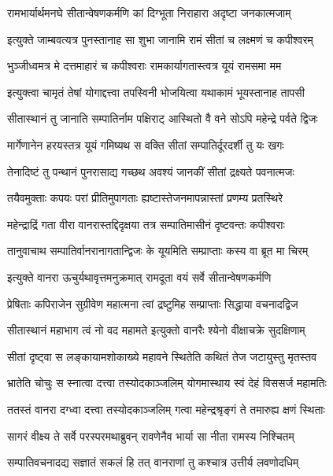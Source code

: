 \twolineshloka
{रामभार्यार्थमनघे सीतान्वेषणकर्मणि}
{कां दिग्भूता निराहारा अदृष्टा जनकात्मजाम्} %

\twolineshloka
{इत्युक्ते जाम्बवत्यत्र पुनस्तानाह सा शुभा}
{जानामि रामं सीतां च लक्ष्मणं च कपीश्वरम्} %

\twolineshloka
{भुञ्जीध्वमत्र मे दत्तमाहारं च कपीश्वराः}
{रामकार्यागतास्त्वत्र यूयं रामसमा मम} %

\twolineshloka
{इत्युक्त्वा चामृतं तेषां योगाद्दत्त्वा तपस्विनी}
{भोजयित्वा यथाकामं भूयस्तानाह तापसी} %

\twolineshloka
{सीतास्थानं तु जानाति सम्पातिर्नाम पक्षिराट्}
{आस्थितो वै वने सोऽपि महेन्द्रे पर्वते द्विजः} %

\twolineshloka
{मार्गेणानेन हरयस्तत्र यूयं गमिष्यथ}
{स वक्ति सीतां सम्पातिर्दूरदर्शी तु यः खगः} %

\twolineshloka
{तेनादिष्टं तु पन्थानं पुनरासाद्य गच्छथ}
{अवश्यं जानकीं सीतां द्रक्ष्यते पवनात्मजः} %

\twolineshloka
{तयैवमुक्ताः कपयः परां प्रीतिमुपागताः}
{ह्यष्टास्तेजनमापन्नास्तां प्रणम्य प्रतस्थिरे} %

\twolineshloka
{महेन्द्राद्रिं गता वीरा वानरास्तद्दिदृक्षया}
{तत्र सम्पातिमासीनं दृष्टवन्तः कपीश्वराः} %

\twolineshloka
{तानुवाचाथ सम्पातिर्वानरानागतान्द्विजः}
{के यूयमिति सम्प्राप्ताः कस्य वा ब्रूत मा चिरम्} %

\twolineshloka
{इत्युक्ते वानरा ऊचुर्यथावृत्तमनुक्रमात्}
{रामदूता वयं सर्वे सीतान्वेषणकर्मणि} %

\twolineshloka
{प्रेषिताः कपिराजेन सुग्रीवेण महात्मना}
{त्वां द्रष्टुमिह सम्प्राप्ताः सिद्धाया वचनादद्विज} %

\twolineshloka
{सीतास्थानं महाभाग त्वं नो वद महामते}
{इत्युक्तो वानरैः श्येनो वीक्षाचक्रे सुदक्षिणाम्} %

\twolineshloka
{सीतां दृष्ट्वा स लङ्कायामशोकाख्ये महावने}
{स्थितेति कथितं तेज जटायुस्तु मृतस्तव} %

\twolineshloka
{भ्रातेति चोचुः स स्नात्वा दत्त्वा तस्योदकाञ्जलिम्}
{योगमास्थाय स्वं देहं विससर्ज महामतिः} %

\twolineshloka
{ततस्तं वानरा दग्ध्वा दत्त्वा तस्योदकाञ्जलिम्}
{गत्वा महेन्द्रश्रृङ्गं ते तमारुह्य क्षणं स्थिताः} %

\twolineshloka
{सागरं वीक्ष्य ते सर्वे परस्परमथाब्रुवन्}
{रावणेनैव भार्या सा नीता रामस्य निश्चितम्} %

\twolineshloka
{सम्पातिवचनादद्य सज्ञातं सकलं हि तत्}
{वानराणां तु कश्चात्र उत्तीर्य लवणोदधिम्} %

